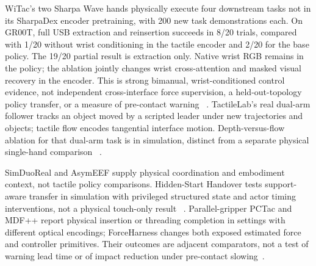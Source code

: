 WiTac's two Sharpa Wave hands physically execute four downstream tasks not in
its SharpaDex encoder pretraining, with 200 new task demonstrations each.
On GR00T, full USB extraction and reinsertion succeeds in 8/20 trials, compared
with 1/20 without wrist conditioning in the tactile encoder and 2/20 for the
base policy. The 19/20 partial result is extraction only. Native wrist RGB
remains in the policy; the ablation jointly changes wrist cross-attention and
masked visual recovery in the encoder. This is strong bimanual, wrist-conditioned
control evidence, not independent cross-interface force supervision, a
held-out-topology policy transfer, or a measure of pre-contact warning
~\cite{nov18witac}. TactileLab's real dual-arm follower tracks an object moved
by a scripted leader under new trajectories and objects; tactile flow encodes
tangential interface motion. Depth-versus-flow ablation for that dual-arm task
is in simulation, distinct from a separate physical single-hand comparison
~\cite{nov18tactilelab}.

SimDuoReal and AsymEEF supply physical coordination and embodiment context,
not tactile policy comparisons. Hidden-Start Handover tests support-aware
transfer in simulation with privileged structured state and actor timing
interventions, not a physical touch-only result
~\cite{nov18simduoreal,nov18asymeef,nov18hiddenstarthandover}.
Parallel-gripper PCTac and MDF++ report physical insertion or threading
completion in settings with different optical encodings; ForceHarness changes
both exposed estimated force and controller primitives. Their outcomes are
adjacent comparators, not a test of warning lead time or of impact reduction
under pre-contact slowing~\cite{nov18pctac,nov18mdf,nov18forceharness}.
